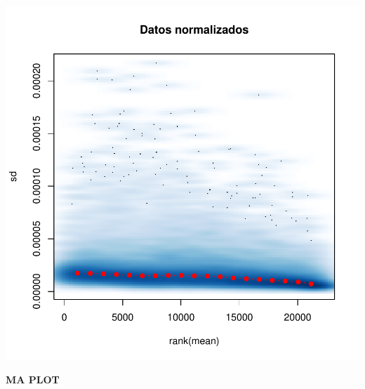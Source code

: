 \documentclass[12pt]{article}
\begin{document}
\begin{itemize}
\includegraphics{JuanHenao_Taller3-005}
\end{itemize}

\textbf{MA PLOT}
\end{document}
